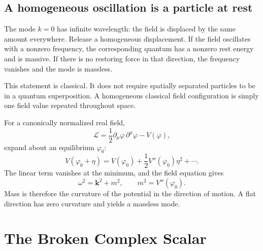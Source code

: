 \subsection{A homogeneous oscillation is a particle at rest}

The mode \(k=0\) has infinite wavelength: the field is displaced by the same
amount everywhere. Release a homogeneous displacement. If the field
oscillates with a nonzero frequency, the corresponding quantum has a nonzero
rest energy and is massive. If there is no restoring force in that direction,
the frequency vanishes and the mode is massless.

This statement is classical. It does not require spatially separated
particles to be in a quantum superposition. A homogeneous classical field
configuration is simply one field value repeated throughout space.

\begin{classroomqa}
\end{classroomqa}

For a canonically normalized real field,
\begin{equation}
  \mathcal L
  =\frac12\partial_\mu\varphi\,\partial^\mu\varphi-V(\varphi),
\end{equation}
expand about an equilibrium \(\varphi_0\):
\begin{equation}
  V(\varphi_0+\eta)
  =V(\varphi_0)
   +\frac12V''(\varphi_0)\eta^2+\cdots.
\end{equation}
The linear term vanishes at the minimum, and the field equation gives
\begin{equation}
  \omega^2=\bm{k}^2+m^2,
  \qquad
  m^2=V''(\varphi_0).
  \label{eq:l08-curvature-mass}
\end{equation}
Mass is therefore the curvature of the potential in the direction of
motion. A flat direction has zero curvature and yields a massless mode.

\section{The Broken Complex Scalar}

